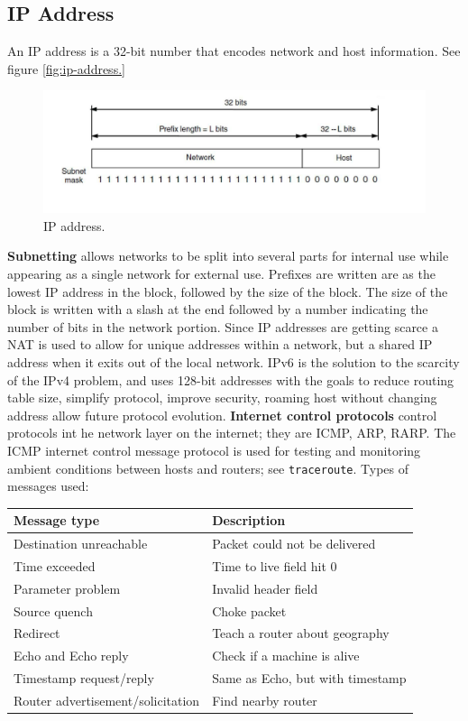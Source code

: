 \documentclass[twoside]{article}
\begin{document}
\subsection{IP Address}
An IP address is a 32-bit number that encodes network and host information. See
figure \ref{fig:ip-address.}
\begin{figure}
  \includegraphics[width=\linewidth]{ip-address.png}
  \caption{IP address.}
  \label{fig:ip-address}
\end{figure}
\textbf{Subnetting} allows networks to be split into several parts for internal
use while appearing as a single network for external use. Prefixes are written
are as the lowest IP address in the block, followed by the size of the block.
The size of the block is written with a slash at the end followed by a number
indicating the number of bits in the network portion. Since IP addresses are 
getting scarce a NAT is used to allow for unique addresses within a network, 
but a shared IP address when it exits out of the local network. IPv6 is the 
solution to the scarcity of the IPv4 problem, and uses 128-bit addresses with
the goals to reduce routing table size, simplify protocol, improve security,
roaming host without changing address allow future protocol evolution. 
\textbf{Internet control protocols} control protocols int he network layer on
the internet; they are ICMP, ARP, RARP. The ICMP internet control message 
protocol is used for testing and monitoring ambient conditions between hosts
and routers; see \texttt{traceroute}. Types of messages used:
\begin{center}
    \begin{tabular}{| l | l |}
    \hline \textbf{Message type} & \textbf{Description} \\ \hline
    \hline Destination unreachable & Packet could not be delivered \\ \hline
    \hline Time exceeded & Time to live field hit 0 \\ \hline
    \hline Parameter problem & Invalid header field \\ \hline
    \hline Source quench & Choke packet \\ \hline
    \hline Redirect & Teach a router about geography \\ \hline
    \hline Echo and Echo reply & Check if a machine is alive \\ \hline
    \hline Timestamp request/reply & Same as Echo, but with timestamp \\ \hline
    \hline Router advertisement/solicitation & Find nearby router \\ \hline
    \end{tabular}
\end{center}
\end{document}
